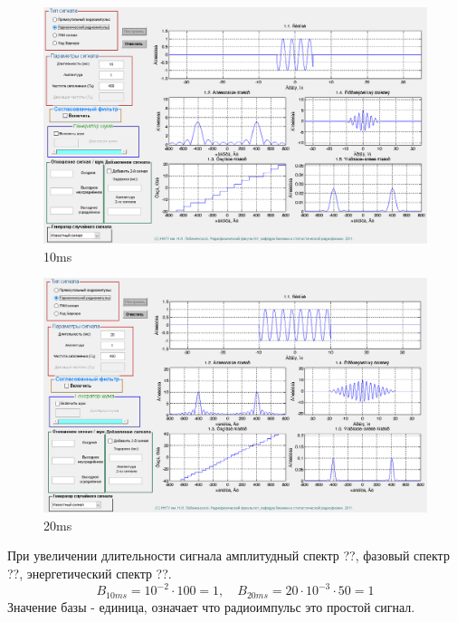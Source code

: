 \begin{figure}[H]
    \centering
    \includegraphics[width=0.9\linewidth]{imgs/t1s2_10.png}
    \caption{10ms}
    \label{fig:task2_10}
\end{figure}
\begin{figure}[H]
    \centering
    \includegraphics[width=0.9\linewidth]{imgs/t1s2_20.png}
    \caption{20ms}
    \label{fig:task2_20}
\end{figure}
При увеличении длительности сигнала амплитудный спектр ??, фазовый спектр ??, энергетический спектр ??.
\begin{equation}
    B_{10ms} = 10^{-2} \cdot 100 = 1, \quad B_{20ms} = 20 \cdot 10^{-3} \cdot 50 = 1
    \label{eq:}
\end{equation}
Значение базы - единица, означает что радиоимпульс это простой сигнал.

